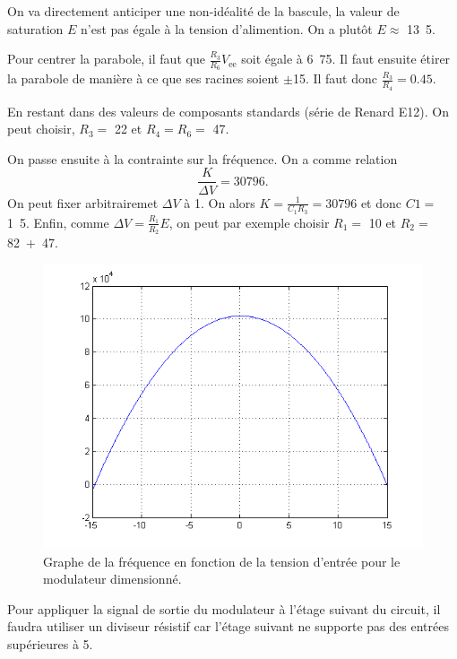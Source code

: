 On va directement anticiper une non-idéalité de la bascule,
la valeur de saturation $E$ n'est pas égale à la tension
d'alimention. On a plutôt $E \approx$ \unit{13.5}{\volt}.

Pour centrer la parabole, il faut que $\frac{R_3}{R_6}V_{\text{ee}}$
soit égale à \unit{6.75}{\volt}. Il faut ensuite étirer la
parabole de manière à ce que ses racines soient $\pm$\unit{15}{\volt}.
Il faut donc $\frac{R_3}{R_4} = 0.45$. 

En restant dans des valeurs de composants standards (série de Renard E12). 
On peut choisir, $R_3 =$ \unit{22}{\kilo\ohm} et $R_4 = R_6 =
$ \unit{47}{\kilo\ohm}.

On passe ensuite à la contrainte sur la fréquence. On a comme
relation 
\[ \frac{K}{\Delta V} = 30796.\]
On peut fixer arbitrairemet $\Delta V$ à \unit{1}{\volt}. On alors
$K = \frac{1}{C_1R_3} = 30796$ et donc $C1 =$ \unit{1.5}{\nano\farad}.
Enfin, comme $\Delta V = \frac{R_1}{R_2}E$, on peut par exemple
choisir $R_1 =$ \unit{10}{\kilo\ohm} et $R_2 =$ \unit{82+47}{\kilo\ohm}.


\begin{figure}[ht]
	\centering
	\includegraphics[scale=0.7]{img/sigma-delta-f-vs-vref-dim.png}
	\caption{Graphe de la fréquence en fonction de la tension d'entrée pour
	le modulateur dimensionné.}
	\label{fig:sigma-delta-f-vs-vref-dim}
\end{figure}

Pour appliquer la signal de sortie du modulateur
à l'étage suivant du circuit, il faudra utiliser un diviseur
résistif car l'étage suivant ne supporte pas des entrées supérieures
à \unit{5}{\volt}.

